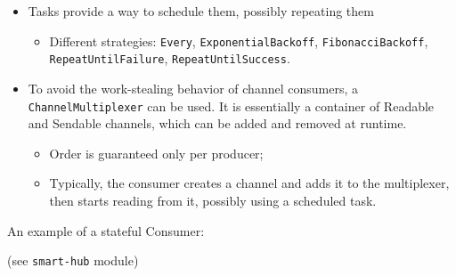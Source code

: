 \documentclass[aspectratio=169,xcolor=dvipsnames]{beamer}
\begin{document}

\begin{frame}
    \begin{itemize}
        \item Tasks provide a way to schedule them, possibly repeating them
        \begin{itemize}
            \item Different strategies: \texttt{Every}, \texttt{ExponentialBackoff}, \texttt{FibonacciBackoff}, \texttt{RepeatUntilFailure}, \texttt{RepeatUntilSuccess}.
        \end{itemize}
        \item To avoid the work-stealing behavior of channel consumers, a \texttt{ChannelMultiplexer} can be used. It is essentially a container of Readable and Sendable channels, which can be added and removed at runtime.
        \begin{itemize}
            \item Order is guaranteed only per producer;
            \item Typically, the consumer creates a channel and adds it to the multiplexer, then starts reading from it, possibly using a scheduled task.
        \end{itemize}
    \end{itemize}
\end{frame}


\begin{frame}
    
\end{frame}


\begin{frame}
    
\end{frame}


\begin{frame}
    An example of a stateful Consumer:
    
    \footnotesize
    (see \texttt{smart-hub} module)
\end{frame}
\end{document}
